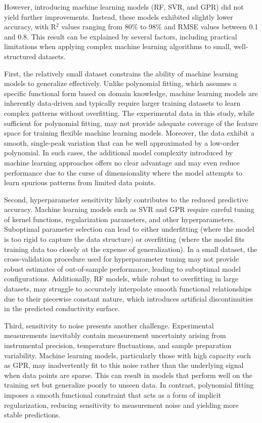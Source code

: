 \documentclass[11pt, a4paper]{article}
\begin{document}
However, introducing machine learning models (RF, SVR, and GPR) did not yield further improvements. Instead, these models exhibited slightly lower accuracy, with R$^2$ values ranging from 80\% to 98\% and RMSE values between 0.1 and 0.8. This result can be explained by several factors, including practical limitations when applying complex machine learning algorithms to small, well-structured datasets.

First, the relatively small dataset constrains the ability of machine learning models to generalize effectively. Unlike polynomial fitting, which assumes a specific functional form based on domain knowledge, machine learning models are inherently data-driven and typically require larger training datasets to learn complex patterns without overfitting. The experimental data in this study, while sufficient for polynomial fitting, may not provide adequate coverage of the feature space for training flexible machine learning models\cite{ref.19}. Moreover, the data exhibit a smooth, single-peak variation that can be well approximated by a low-order polynomial. In such cases, the additional model complexity introduced by machine learning approaches offers no clear advantage and may even reduce performance due to the curse of dimensionality where the model attempts to learn spurious patterns from limited data points.

Second, hyperparameter sensitivity likely contributes to the reduced predictive accuracy. Machine learning models such as SVR and GPR require careful tuning of kernel functions, regularization parameters, and other hyperparameters. Suboptimal parameter selection can lead to either underfitting (where the model is too rigid to capture the data structure) or overfitting (where the model fits training data too closely at the expense of generalization)\cite{ref.20}. In a small dataset, the cross-validation procedure used for hyperparameter tuning may not provide robust estimates of out-of-sample performance, leading to suboptimal model configurations. Additionally, RF models, while robust to overfitting in large datasets, may struggle to accurately interpolate smooth functional relationships due to their piecewise constant nature, which introduces artificial discontinuities in the predicted conductivity surface.

Third, sensitivity to noise presents another challenge. Experimental measurements inevitably contain measurement uncertainty arising from instrumental precision, temperature fluctuations, and sample preparation variability. Machine learning models, particularly those with high capacity such as GPR, may inadvertently fit to this noise rather than the underlying signal when data points are sparse. This can result in models that perform well on the training set but generalize poorly to unseen data. In contrast, polynomial fitting imposes a smooth functional constraint that acts as a form of implicit regularization, reducing sensitivity to measurement noise and yielding more stable predictions.
\end{document}
